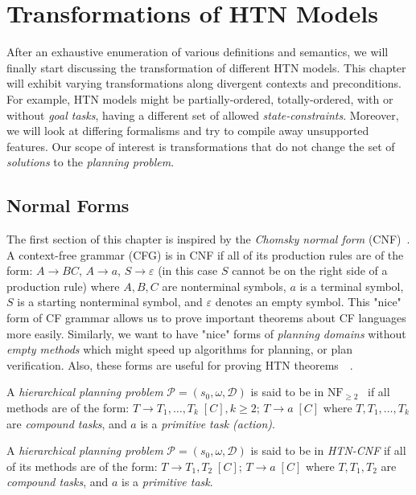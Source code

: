 \chapter{Transformations of {HTN} {M}odels}

\medskip\noindent
After an exhaustive enumeration of various definitions and semantics, we will finally start discussing the transformation of different HTN models. This chapter will exhibit varying transformations along divergent contexts and preconditions. For example, HTN models might be partially-ordered, totally-ordered, with or without \emph{goal tasks}, having a different set of allowed \emph{state-constraints}. Moreover, we will look at differing formalisms and try to compile away unsupported features. Our scope of interest is transformations that do not change the set of \emph{solutions} to the \emph{planning problem}.

\section{Normal Forms}

\medskip\noindent
The first section of this chapter is inspired by the \emph{Chomsky normal form} (CNF)~\cite{chytil}. A context-free grammar (CFG) is in CNF if all of its production rules are of the form: $A \rightarrow BC$, $A \rightarrow a$, $S \rightarrow \varepsilon$ (in this case $S$ cannot be on the right side of a production rule) where $A, B, C$ are nonterminal symbols, $a$ is a terminal symbol, $S$ is a starting nonterminal symbol, and $\varepsilon$ denotes an empty symbol. This "nice" form of CF grammar allows us to prove important theorems about CF languages more easily. Similarly, we want to have "nice" forms of \emph{planning domains} without \emph{empty methods} which might speed up algorithms for planning, or plan verification. Also, these forms are useful for proving HTN theorems~\cite{langclassification}~\cite{cmyk}.

\begin{defn}\label{def04:14}
    A \emph{hierarchical planning problem} $\mathcal{P} = (s_0,\omega,\mathcal{D})$ is said to be in $\text{NF}_{\geq 2}$~\cite{langclassification} if all methods are of the form: $T \rightarrow T_1, \dots, T_k \; [C], k \geq 2$; $T \rightarrow a \; [C]$ where $T, T_1, \dots, T_k$ are \emph{compound tasks}, and $a$ is a \emph{primitive task (action)}.
\end{defn}

\begin{defn}\label{def04:15}
    A \emph{hierarchical planning problem} $\mathcal{P} = (s_0,\omega,\mathcal{D})$ is said to be in \emph{HTN-CNF} if all of its methods are of the form: $T \rightarrow T_1, T_2 \; [C]$; $T \rightarrow a \; [C]$ where $T, T_1, T_2$ are \emph{compound tasks}, and $a$ is a \emph{primitive task}. 
\end{defn}


